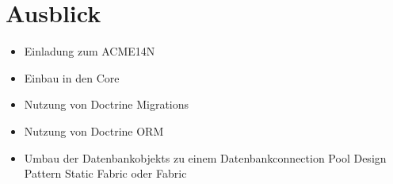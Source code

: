 \chapter{Ausblick}
\label{ch:outlook}
\begin{itemize}
	\item{Einladung zum ACME14N}
	\item{Einbau in den Core}
	\item{Nutzung von Doctrine Migrations}
	\item{Nutzung von Doctrine ORM}
	\item{Umbau der Datenbankobjekts zu einem Datenbankconnection Pool}
	Design Pattern Static Fabric oder Fabric
\end{itemize}
